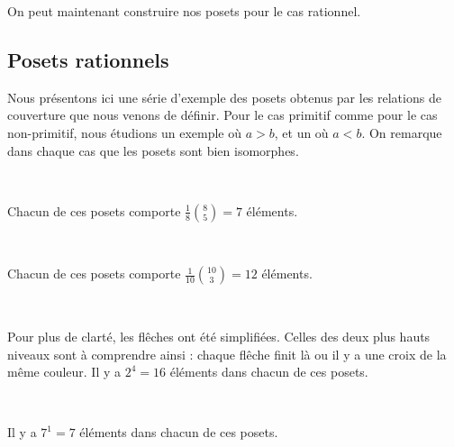 On peut maintenant construire nos posets pour le cas rationnel.

\subsection{Posets rationnels}

Nous présentons ici une série d'exemple des posets obtenus par les relations
de couverture que nous venons de définir.
Pour le cas primitif comme pour le cas non-primitif, nous étudions un
exemple où $a > b$, et un où $a < b$.
On remarque dans chaque cas que les posets sont bien isomorphes.

\begin{expl}
    ~\\
    \begin{center}
        
        Chacun de ces posets comporte $\frac {1}{8} \binom{8}{5} = 7$
        éléments.
    \end{center}
\end{expl}

\newpage
\begin{expl}
    ~\\
    \begin{center}
        
        Chacun de ces posets comporte $\frac {1}{10} \binom{10}{3} = 12$
        éléments.
    \end{center}
\end{expl}

\begin{expl}
    ~\\
    \begin{center}
        
        Pour plus de clarté, les flêches ont été simplifiées.
        Celles des deux plus hauts niveaux sont à comprendre ainsi :
        chaque flêche finit là ou il y a une croix de la même couleur.
        Il y a  $2^4 = 16$ éléments dans chacun de ces posets.
    \end{center}
\end{expl}


\begin{expl}
    ~\\
    \begin{center}
        
        Il y a $7^1 = 7$ éléments dans chacun de ces posets.
    \end{center}
\end{expl}

